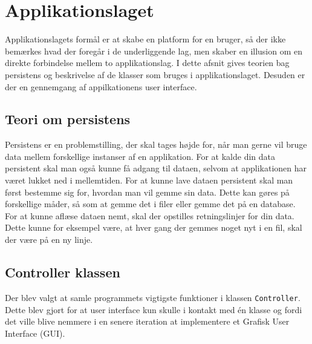\section{Applikationslaget}
Applikationslagets formål er at skabe en platform for en bruger, så der ikke bemærkes hvad der foregår i de underliggende lag, men skaber en illusion om en direkte forbindelse mellem to applikationslag.
\newline
I dette afsnit gives teorien bag persistens og beskrivelse af de klasser som bruges i applikationslaget. Desuden er der en gennemgang af appilkationens user interface.

\subsection{Teori om persistens}
Persistens er en problemstilling, der skal tages højde for, når man gerne vil bruge data mellem forskellige instanser af en applikation. For at  kalde din data persistent skal man også kunne få adgang til dataen, selvom at applikationen har været lukket ned i mellemtiden. For at kunne lave dataen persistent skal man først bestemme sig for, hvordan man vil gemme sin data. Dette kan gøres på forskellige måder, så som at gemme det i filer eller gemme det på en database. For at kunne aflæse dataen nemt, skal der opstilles retningslinjer for din data. Dette kunne for eksempel være, at hver gang der gemmes noget nyt i en fil, skal der være på en ny linje\cite{oosa}.

\subsection{Controller klassen}
Der blev valgt at samle programmets vigtigste funktioner i klassen \texttt{Controller}. Dette blev gjort for at user interface kun skulle i kontakt med én klasse og fordi det ville blive nemmere i en senere iteration at implementere et Grafisk User Interface (GUI).

